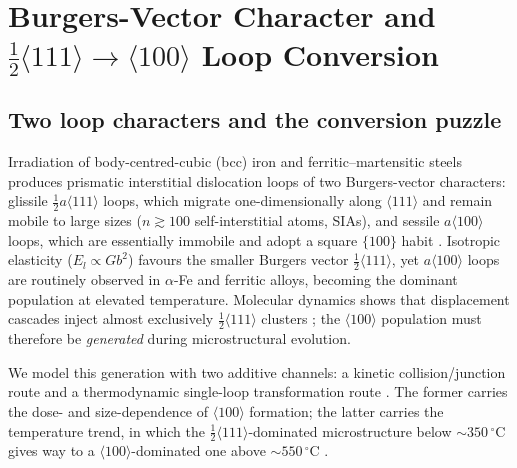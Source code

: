 
\section{Burgers-Vector Character and \texorpdfstring{$\tfrac12\langle111\rangle\!\to\!\langle100\rangle$}{1/2<111> to <100>} Loop Conversion}
\label{sec:loop-conversion}

\subsection{Two loop characters and the conversion puzzle}

Irradiation of body-centred-cubic (bcc) iron and ferritic--martensitic steels
produces prismatic interstitial dislocation loops of two Burgers-vector
characters: glissile $\tfrac12 a\langle111\rangle$ loops, which migrate
one-dimensionally along $\langle111\rangle$ and remain mobile to large sizes
($n\gtrsim100$ self-interstitial atoms, SIAs), and sessile $a\langle100\rangle$
loops, which are essentially immobile and adopt a square $\{100\}$ habit
\citep{Masters1965,EyreBartlett1965}.  Isotropic elasticity ($E_l\propto Gb^2$)
favours the smaller Burgers vector $\tfrac12\langle111\rangle$, yet
$a\langle100\rangle$ loops are routinely observed in $\alpha$-Fe and ferritic
alloys, becoming the dominant population at elevated temperature.  Molecular
dynamics shows that displacement cascades inject almost exclusively
$\tfrac12\langle111\rangle$ clusters \citep{Marian2002}; the $\langle100\rangle$
population must therefore be \emph{generated} during microstructural evolution.

We model this generation with two additive channels: a kinetic
collision/junction route \citep{Marian2002} and a thermodynamic
single-loop transformation route \citep{Dudarev2008}.  The former carries the
dose- and size-dependence of $\langle100\rangle$ formation; the latter carries
the temperature trend, in which the $\tfrac12\langle111\rangle$-dominated
microstructure below $\sim350\,^\circ$C gives way to a
$\langle100\rangle$-dominated one above $\sim550\,^\circ$C
\citep{Arakawa2006,Dudarev2008}.

